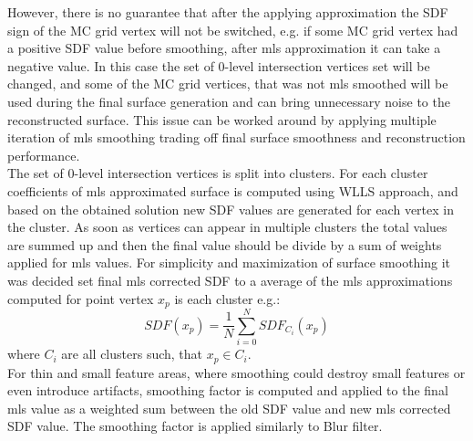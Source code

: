 However, there is no guarantee that after the applying approximation the SDF sign of the MC grid vertex will not be switched, e.g. if some MC grid vertex had a positive SDF value before smoothing, after mls approximation it can take a negative value. In this case the set of 0-level intersection vertices set will be changed, and some of the MC grid vertices, that was not mls smoothed will be used during the final surface generation and can bring unnecessary noise to the reconstructed surface. This issue can be worked around by applying multiple iteration of mls smoothing trading off final surface smoothness and reconstruction performance.\\

The set of 0-level intersection vertices is split into clusters. For each cluster coefficients of mls approximated surface is computed using WLLS approach, and based on the obtained solution new SDF values are generated for each vertex in the cluster. As soon as vertices can appear in multiple clusters the total values are summed up and then the final value should be divide by a sum of weights applied for mls values. For simplicity and maximization of surface smoothing it was decided set final mls corrected SDF to a average of the mls approximations computed for point vertex $x_p$ is each cluster e.g.:
\begin{equation}
	SDF(x_p) = \dfrac{1}{N} \sum_{i = 0}^N{SDF_{C_i}(x_p)}
\end{equation}
where $C_i$ are all clusters such, that $x_p \in C_i$.\\

For thin and small feature areas, where smoothing could destroy small features or even introduce artifacts, smoothing factor is computed and applied to the final mls value as a weighted sum between the old SDF value and new mls corrected SDF value. The smoothing factor is applied similarly to Blur filter.\\

